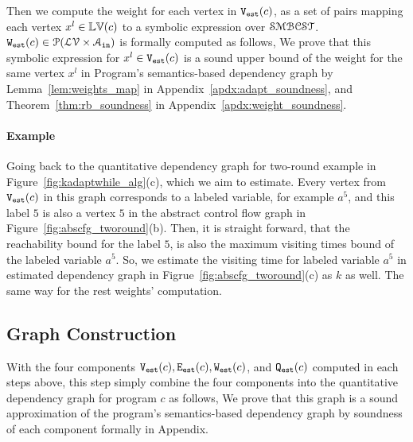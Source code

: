 Then we compute the weight for each vertex in $\mathtt{{V_{est}}}(c)$,
as a set of pairs 
mapping each vertex $x^l \in \mathbb{LV}(c)$ to a symbolic expression over $\mathcal{SMBCST}$.
$\mathtt{{W_{est}}}(c) \in \mathcal{P}(\mathcal{LV} \times \mathcal{A}_{\mathtt{in}})$ is formally computed
as follows,
%
We prove that this 
symbolic expression for $x^l \in \mathtt{{V_{est}}}(c)$ is a sound upper bound of 
the weight for the same vertex $x^l$ in Program's semantics-based dependency graph by Lemma~\ref{lem:weights_map}
in Appendix~\ref{apdx:adapt_soundness}, and Theorem~\ref{thm:rb_soundness} in Appendix~\ref{apdx:weight_soundness}.

\paragraph*{Example}
Going back to the
quantitative dependency graph for two-round example in
Figure~\ref{fig:kadaptwhile_alg}(c), which we aim to estimate.
%
Every vertex from $\mathtt{{V_{est}}}(c)$ in this graph corresponds to a labeled variable, for example $a^5$,
and this label $5$ is also a vertex $5$ in the abstract control flow graph in Figure~\ref{fig:abscfg_tworound}(b).
%
Then, it is straight forward, 
that the reachability bound for the label $5$, 
is also the maximum visiting times bound of the labeled variable $a^5$.
So, we estimate the visiting time for  labeled variable $a^5$ in estimated dependency graph in Figrue~\ref{fig:abscfg_tworound}(c) as $k$ as well.
%
The same way for the rest weights' computation.
%
%
\subsection{Graph Construction}
   \label{sec:alg_graphgen}
   With the four components $\mathtt{{V_{est}}}(c), \mathtt{{E_{est}}}(c), \mathtt{{W_{est}}}(c)$, and $\mathtt{{Q_{est}}}(c)$
   computed in each steps above, this step simply combine the four components into the quantitative dependency graph for program $c$ as follows,
   \highlight{
     \[
       \progG(c) = (\progV(c), \progE(c), \progW(c), \progF(c)).
       \]
   }
   We prove that this graph is a sound approximation of the program's semantics-based dependency graph by soundness of each component formally in Appendix.

